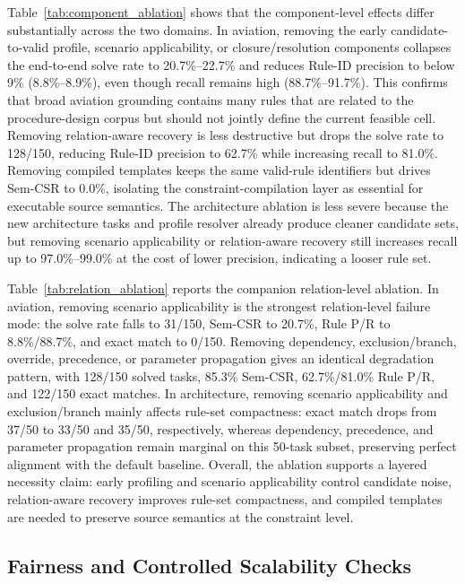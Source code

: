 ﻿\documentclass[a4paper,fleqn]{cas-dc}
\begin{document}
Table~\ref{tab:component_ablation} shows that the component-level effects differ
substantially across the two domains. In aviation, removing the early
candidate-to-valid profile, scenario applicability, or closure/resolution
components collapses the end-to-end solve rate to 20.7\%--22.7\% and reduces
Rule-ID precision to below 9\% (8.8\%--8.9\%), even though recall remains high 
(88.7\%--91.7\%). This confirms that broad aviation grounding contains many rules 
that are related to the procedure-design corpus but should not jointly define 
the current feasible cell. Removing relation-aware recovery is less destructive 
but drops the solve rate to 128/150, reducing Rule-ID precision to 62.7\% while 
increasing recall to 81.0\%. Removing compiled templates keeps the same 
valid-rule identifiers but drives Sem-CSR to 0.0\%, isolating the 
constraint-compilation layer as essential for executable source semantics. The
architecture ablation is less severe because the new architecture tasks and
profile resolver already produce cleaner candidate sets, but removing scenario
applicability or relation-aware recovery still increases recall up to 97.0\%--99.0\% 
at the cost of lower precision, indicating a looser rule set.

Table~\ref{tab:relation_ablation} reports the companion relation-level
ablation. In aviation, removing scenario applicability is the strongest
relation-level failure mode: the solve rate falls to 31/150, Sem-CSR to 20.7\%,
Rule P/R to 8.8\%/88.7\%, and exact match to 0/150. Removing dependency,
exclusion/branch, override, precedence, or parameter propagation gives an
identical degradation pattern, with 128/150 solved tasks, 85.3\% Sem-CSR,
62.7\%/81.0\% Rule P/R, and 122/150 exact matches. In architecture, removing
scenario applicability and exclusion/branch mainly affects rule-set compactness:
exact match drops from 37/50 to 33/50 and 35/50, respectively, whereas
dependency, precedence, and parameter propagation remain marginal on this 50-task
subset, preserving perfect alignment with the default baseline. Overall, the 
ablation supports a layered necessity claim: early profiling and scenario 
applicability control candidate noise, relation-aware recovery improves 
rule-set compactness, and compiled templates are needed to preserve 
source semantics at the constraint level.

\FloatBarrier

\subsection{Fairness and Controlled Scalability Checks}
\label{sec:fairness_scalability_exp}
\end{document}
